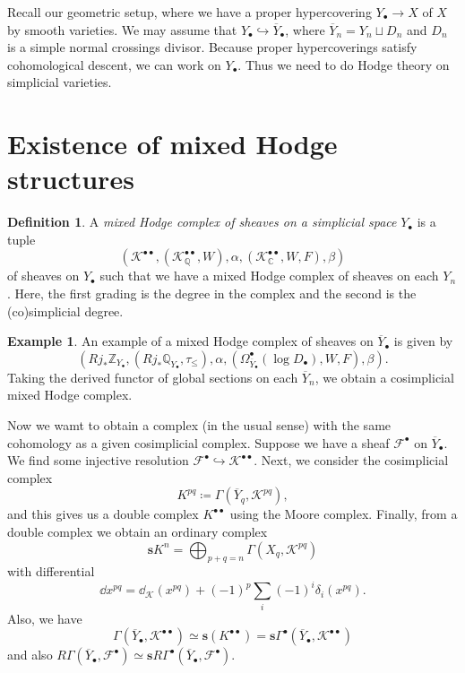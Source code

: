 \documentclass[leqno, openany]{memoir}
\theoremstyle{definition}
\newtheorem{defn}[thm]{Definition}
\newtheorem{exm}[thm]{Example}
\theoremstyle{remark}
\theoremstyle{plain}
\theoremstyle{definition}
\theoremstyle{remark}
\newcommand{\C}{\mathbb{C}}
\newcommand{\Z}{\mathbb{Z}}
\newcommand{\Q}{\mathbb{Q}}
\newcommand{\mc}[1]{\mathcal{#1}}
\newcommand{\ol}[1]{\overline{#1}}
\begin{document}
Recall our geometric setup, where we have a proper hypercovering $Y_{\bullet} \to X$ of $X$ by smooth varieties. We may assume that $Y_{\bullet} \hookrightarrow \ol{Y}_{\bullet}$, where $\ol{Y}_n = Y_n \sqcup D_n$ and $D_n$ is a simple normal crossings divisor. Because proper hypercoverings satisfy cohomological descent, we can work on $Y_{\bullet}$. Thus we need to do Hodge theory on simplicial varieties.

\section{Existence of mixed Hodge structures}%
\label{sec:existence_of_mixed_hodge_structures}

\begin{defn}
    A \textit{mixed Hodge complex of sheaves on a simplicial space} $Y_{\bullet}$ is a tuple 
    \[ (\mc{K}^{\bullet \bullet}, (\mc{K}_{\Q}^{\bullet \bullet}, W), \alpha, (\mc{K}_{\C}^{\bullet\bullet}, W, F), \beta) \] 
    of sheaves on $Y_{\bullet}$ such that we have a mixed Hodge complex of sheaves on each $Y_n$. Here, the first grading is the degree in the complex and the second is the (co)simplicial degree.
\end{defn}

\begin{exm}
    An example of a mixed Hodge complex of sheaves on $\ol{Y}_{\bullet}$ is given by
    \[ (R j_* \Z_{Y_{\bullet}}, (R j_* \Q_{Y_{\bullet}}, \tau_{\leq}), \alpha, (\Omega^{\bullet}_{\ol{Y}_{\bullet}}(\log D_{\bullet}), W, F), \beta). \]
    Taking the derived functor of global sections on each $\ol{Y}_n$, we obtain a cosimplicial mixed Hodge complex.
\end{exm}

Now we wamt to obtain a complex (in the usual sense) with the same cohomology as a given cosimplicial complex. Suppose we have a sheaf $\mc{F}^{\bullet}$ on $\ol{Y}_{\bullet}$. We find some injective resolution $\mc{F}^{\bullet} \hookrightarrow \mc{K}^{\bullet \bullet}$. Next, we consider the cosimplicial complex
\[ K^{pq} \coloneqq \Gamma(\ol{Y}_q, \mc{K}^{pq}), \]
and this gives us a double complex $K^{\bullet \bullet}$ using the Moore complex. Finally, from a double complex we obtain an ordinary complex
\[ \mathbf{s}K^n = \bigoplus_{p + q = n} \Gamma(X_q, \mc{K}^{pq}) \]
with differential
\[ \dd {x^{pq}} = \dd_{\mc{K}}(x^{pq}) + (-1)^p \sum_i (-1)^i \delta_i(x^{pq}). \]
Also, we have
\[ \Gamma(\ol{Y}_{\bullet}, \mc{K}^{\bullet \bullet}) \simeq \mathbf{s}(K^{\bullet \bullet}) = \mathbf{s} \Gamma^{\bullet}(\ol{Y}_{\bullet}, \mc{K}^{\bullet \bullet}) \]
and also $R \Gamma(\ol{Y}_{\bullet}, \mc{F}^{\bullet}) \simeq \mathbf{s} R \Gamma^{\bullet}(\ol{Y}_{\bullet}, \mc{F}^{\bullet})$.
\end{document}
